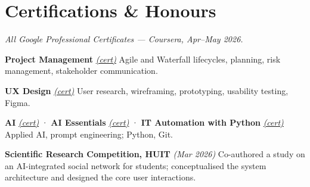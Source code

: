 \documentclass[a4paper,9pt]{extarticle}
\begin{document}
\section{Certifications \& Honours}
\begin{cvPlain}
  \item {\itshape All Google Professional Certificates — Coursera, Apr--May 2026.}
  \item \textbf{Project Management} \href{https://www.coursera.org/account/accomplishments/specialization/certificate/Y0JMYWUVVJG9}{\itshape (cert)} \; Agile and Waterfall lifecycles, planning, risk management, stakeholder communication.
  \item \textbf{UX Design} \href{https://coursera.org/verify/professional-cert/4NPVV3FRP07M}{\itshape (cert)} \; User research, wireframing, prototyping, usability testing, Figma.
  \item \textbf{AI} \href{https://www.coursera.org/account/accomplishments/specialization/certificate/84G1CO6ABM7P}{\itshape (cert)} · \textbf{AI Essentials} \href{https://www.coursera.org/account/accomplishments/specialization/certificate/POYFWIV2Y5VW}{\itshape (cert)} · \textbf{IT Automation with Python} \href{https://www.coursera.org/account/accomplishments/specialization/certificate/ERRCIOPXMF5I}{\itshape (cert)} \; Applied AI, prompt engineering; Python, Git.
  \item \textbf{Scientific Research Competition, HUIT} {\itshape (Mar 2026)} \; Co-authored a study on an AI-integrated social network for students; conceptualised the system architecture and designed the core user interactions.
\end{cvPlain}
\end{document}
